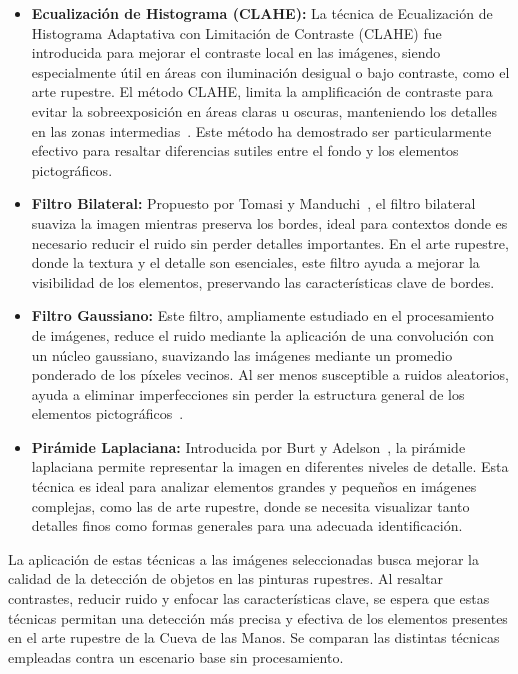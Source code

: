 \begin{itemize}
    \item \textbf{Ecualización de Histograma (CLAHE):}
    La técnica de Ecualización de Histograma Adaptativa con Limitación de Contraste (CLAHE) fue introducida para mejorar el contraste local en las imágenes, siendo especialmente útil en áreas con iluminación desigual o bajo contraste, como el arte rupestre.
    El método CLAHE, limita la amplificación de contraste para evitar la sobreexposición en áreas claras u oscuras, manteniendo los detalles en las zonas intermedias~\cite{zuiderveld1994contrast}.
    Este método ha demostrado ser particularmente efectivo para resaltar diferencias sutiles entre el fondo y los elementos pictográficos.

    \item \textbf{Filtro Bilateral:}
    Propuesto por Tomasi y Manduchi~\cite{tomasi1998bilateral}, el filtro bilateral suaviza la imagen mientras preserva los bordes, ideal para contextos donde es necesario reducir el ruido sin perder detalles importantes.
    En el arte rupestre, donde la textura y el detalle son esenciales, este filtro ayuda a mejorar la visibilidad de los elementos, preservando las características clave de bordes.

    \item \textbf{Filtro Gaussiano:}
    Este filtro, ampliamente estudiado en el procesamiento de imágenes, reduce el ruido mediante la aplicación de una convolución con un núcleo gaussiano, suavizando las imágenes mediante un promedio ponderado de los píxeles vecinos.
    Al ser menos susceptible a ruidos aleatorios, ayuda a eliminar imperfecciones sin perder la estructura general de los elementos pictográficos~\cite{gonzalesWood}.

    \item \textbf{Pirámide Laplaciana:}
    Introducida por Burt y Adelson~\cite{burt1983laplacian}, la pirámide laplaciana permite representar la imagen en diferentes niveles de detalle.
    Esta técnica es ideal para analizar elementos grandes y pequeños en imágenes complejas, como las de arte rupestre, donde se necesita visualizar tanto detalles finos como formas generales para una adecuada identificación.
\end{itemize}

La aplicación de estas técnicas a las imágenes seleccionadas busca mejorar la calidad de la detección de objetos en las pinturas rupestres.
Al resaltar contrastes, reducir ruido y enfocar las características clave, se espera que estas técnicas permitan una detección más precisa y efectiva de los elementos presentes en el arte rupestre de la Cueva de las Manos.
Se comparan las distintas técnicas empleadas contra un escenario base sin procesamiento.

